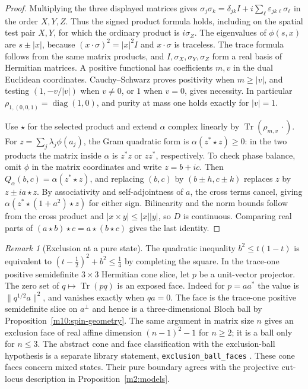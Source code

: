 \documentclass[11pt,reqno]{amsart}
\theoremstyle{definition}
\theoremstyle{remark}
\newtheorem{remark}[theorem]{Remark}
\numberwithin{equation}{section}
\begin{document}
\begin{proof}
Multiplying the three displayed matrices gives
\(\sigma_j\sigma_k=\delta_{jk}I+i\sum_\ell
\varepsilon_{jk\ell}\sigma_\ell\) in the order \(X,Y,Z\).
Thus the signed product formula holds, including on the spatial
test pair \(X,Y\), for which the ordinary product is \(i\sigma_Z\).
The eigenvalues of \(\phi(s,x)\) are \(s\pm |x|\), because
\((x\cdot\sigma)^2=|x|^2 I\) and \(x\cdot\sigma\) is traceless.
The trace formula follows from the same matrix products, and
\(I,\sigma_X,\sigma_Y,\sigma_Z\) form a real basis of Hermitian
matrices. A positive functional has coefficients \(m,v\) in the
dual Euclidean coordinates. Cauchy--Schwarz proves positivity
when \(m\ge |v|\), and testing \((1,-v/|v|)\) when \(v\ne0\),
or \(1\) when \(v=0\), gives necessity. In particular
\(\rho_{1,(0,0,1)}=\operatorname{diag}(1,0)\), and purity at
mass one holds exactly for \(|v|=1\).

Use \(\star\) for the selected product and extend \(\alpha\)
complex linearly by \(\operatorname{Tr}(\rho_{m,v}\,\cdot)\).
For \(z=\sum_j\lambda_j\phi(a_j)\), the Gram quadratic form is
\(\alpha(z^*\star z)\ge0\): in the two products the matrix
inside \(\alpha\) is \(z^*z\) or \(zz^*\), respectively.
To check phase balance, omit \(\phi\) in the matrix coordinates
and write \(z=b+ic\). Then \(Q_\alpha(b,c)=\alpha(z^*\star z)\),
and replacing \((b,c)\) by \((b\pm h,c\pm k)\) replaces \(z\)
by \(z\pm ia\star z\). By associativity and self-adjointness of
\(a\), the cross terms cancel, giving
\(\alpha(z^*\star(1+a^2)\star z)\) for either sign.
Bilinearity and the norm bounds follow from the cross product
and \(|x\times y|\le |x||y|\), so \(D\) is continuous.
Comparing real parts of \((a\star b)\star c=a\star(b\star c)\)
gives the last identity.
\end{proof}

\begin{remark}[Exclusion at a pure state]\label{m10:exclusion}
The quadratic inequality \(b^2\le t(1-t)\) is equivalent to
\((t-\tfrac12)^2+b^2\le\tfrac14\) by completing the square.
In the trace-one positive semidefinite \(3\times3\) Hermitian
cone slice, let \(p\) be a unit-vector projector. The zero set
of \(q\mapsto\operatorname{Tr}(pq)\) is an exposed face.
Indeed for \(p=aa^*\) the value is \(\|q^{1/2}a\|^2\), and
vanishes exactly when \(qa=0\). The face is the trace-one
positive semidefinite slice on \(a^\perp\) and hence is a
three-dimensional Bloch ball by Proposition~\ref{m10:spin-geometry}.
The same argument in matrix size \(n\) gives an exclusion face
of real affine dimension \((n-1)^2-1\) for \(n\ge2\); it is a ball
only for \(n\le3\).
The abstract cone and face classification with the exclusion-ball
hypothesis is a separate library statement,
\texttt{exclusion\_ball\_faces} \cite{Tru}.
These cone faces concern mixed states. Their pure boundary
agrees with the projective cut-locus description in
Proposition~\ref{m2:models}.
\end{remark}
\end{document}
